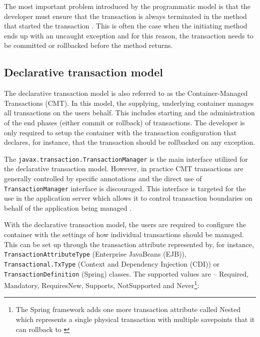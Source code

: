 \documentclass[oneside,
  digital, %
  table,   %
  lof,     %
  lot,     %
]{fithesis3}
\begin{document}
The most important problem introduced by the programmatic model is that the developer must ensure that the transaction is always terminated in the method that started the transaction \cite{java_transaction_design_strategies}. This is often the case when  the initiating method ends up with an uncaught exception and for this reason, the transaction needs to be committed or rollbacked before the method returns.

\subsection{Declarative transaction model}
\label{sec:decl-tran-model}

The declarative transaction model is also referred to as the Container-Managed Transactions (CMT). In this model, the supplying, underlying container manages all transactions on the users behalf. This includes starting and the administration of the end phases (either commit or rollback) of transactions. The developer is only required to setup the container with the transaction configuration that declares, for instance, that the transaction should be rollbacked on any exception.

The \texttt{javax.transaction.TransactionManager} is the main interface utilized for the declarative transaction model. However, in practice CMT transactions are generally controlled by specific annotations and the direct use of \texttt{TransactionManager} interface is discouraged. This interface is targeted for the use in the application server which allows it to control transaction boundaries on behalf of the application being managed \cite{jta}.

With the declarative transaction model, the users are required to configure the container with the settings of how individual transactions should be managed. This can be set up through the transaction attribute represented by, for instance, \texttt{TransactionAttributeType} (Enterprise JavaBeans (EJB)), \texttt{Transactional.TxType} (Context and Dependency Injection (CDI)) or \texttt{TransactionDefinition} (Spring) classes. The supported values are -- Required, Mandatory, RequiresNew, Supports, NotSupported and Never\footnote{The Spring framework adds one more transaction attribute called Nested which represents a single physical transaction with multiple savepoints that it can rollback to \cite{spring_transaction_management_documentation}}:
\end{document}
